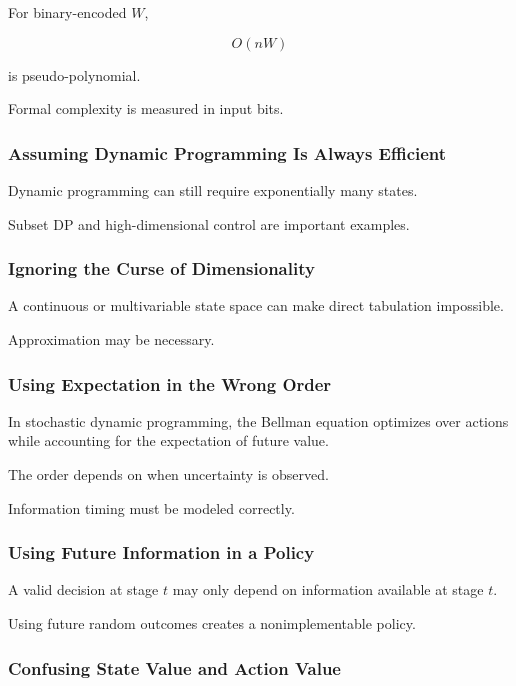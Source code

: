 For binary-encoded \(W\),

\[
O(nW)
\]

is pseudo-polynomial.

Formal complexity is measured in input bits.

\subsubsection{Assuming Dynamic Programming Is Always Efficient}

Dynamic programming can still require exponentially many states.

Subset DP and high-dimensional control are important examples.

\subsubsection{Ignoring the Curse of Dimensionality}

A continuous or multivariable state space can make direct tabulation
impossible.

Approximation may be necessary.

\subsubsection{Using Expectation in the Wrong Order}

In stochastic dynamic programming, the Bellman equation optimizes over
actions while accounting for the expectation of future value.

The order depends on when uncertainty is observed.

Information timing must be modeled correctly.

\subsubsection{Using Future Information in a Policy}

A valid decision at stage \(t\) may only depend on information available
at stage \(t\).

Using future random outcomes creates a nonimplementable policy.

\subsubsection{Confusing State Value and Action Value}

